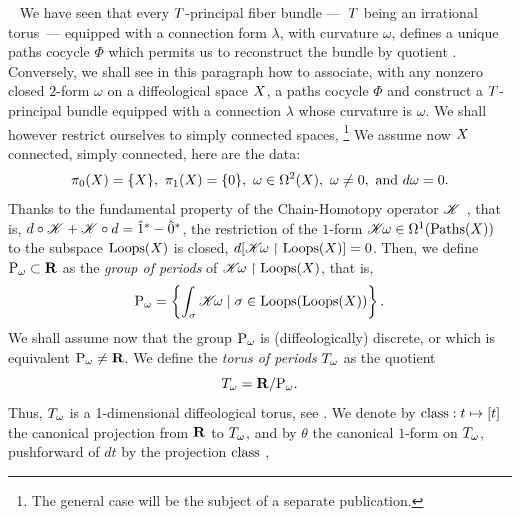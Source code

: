 \begin{article}%
  \label{Integration-bundles-of-closed-2-forms}~
  We have seen that every $T$-principal fiber bundle
  ---~$T$ being an irrational torus~---
  equipped with a connection form $\lambda$,
  with curvature $\omega$,
  defines a unique paths cocycle $\Phi$ which permits us to reconstruct the bundle by quotient .
  Conversely,
  we shall see in this paragraph how to associate,
  with any nonzero closed $2$-form $\omega$ on a diffeological space $X$,
  a paths cocycle $\Phi$ and construct a $T$-principal bundle equipped with a connection $\lambda$ whose curvature is $\omega$.
  We shall however restrict ourselves to simply connected spaces,%
  \footnote{The general case will be the subject of a separate publication.}
  We assume now $X$ connected,
  simply connected,
  here are the data:
  $$%
  \pi_0(\X) = \{\X\}, \ \pi_1(\X) = \{0\}, \ \omega \in \DForms^2(\X), \ \omega \neq 0, \text{ and } d\omega = 0.
  $$%
  Thanks to the fundamental property of the Chain-Homotopy operator $\mathscr{K}$ ,
  that is,
  $d \circ \mathscr{K} + \mathscr{K} \circ d = \hat 1^* - \hat 0^*$,
  the restriction of the $1$-form $\mathscr{K}\!\omega \in \Omega^1(\operatorname{Paths}(X))$ to the subspace $\operatorname{Loops}(X)$ is closed,
  $d[\mathscr{K}\!\omega \restriction \operatorname{Loops}(X)] = 0$.
  Then,
  we define ${\operatorname{P}}_\omega \subset {\mathbf R}$ as the {\em group of periods} of $\mathscr{K}\!\omega \restriction \operatorname{Loops}(X)$,
  that is,
  $$%
  \Periods_\omega = \left\{ \int_\sigma \CHK\!\omega \mid \sigma \in \Loops(\Loops(\X)) \right\}.
  $$%
  We shall assume now that the group ${\operatorname{P}}_\omega$ is (diffeologically) discrete,
  or which is equivalent ${\operatorname{P}}_\omega \neq {\mathbf R}$.
  We define the {\em torus of periods} $T_\omega$ as the quotient
  \begin{equation}
    \renewcommand{\theequation}{$\clubsuit$}
    \Torus_\omega = \RR /\Periods_\omega.
  \end{equation}
  Thus,
  $T_\omega$ is a 1-dimensional diffeological torus,
  see .
  We denote by $\operatorname{class} : t \mapsto \left[ t \right]$ the canonical projection from ${\mathbf R}$ to $T_\omega$,
  and by $\theta$ the canonical $1$-form on $T_\omega$,
  pushforward of $dt$ by the projection $\operatorname{class}$ ,

\end{article}
